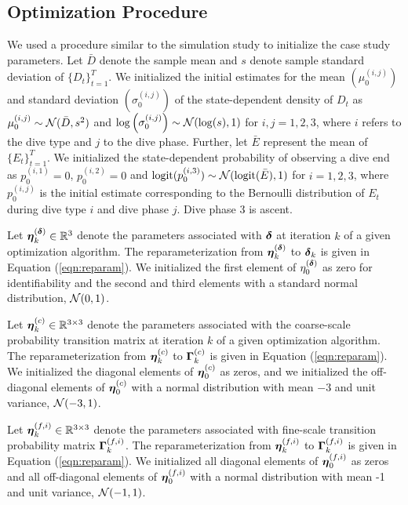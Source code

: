 \subsection{Optimization Procedure}

We used a procedure similar to the simulation study to initialize the case study parameters. Let $\bar D$ denote the sample mean and $s$ denote sample standard deviation of $\{D_t\}_{t=1}^T$. We initialized the initial estimates for the mean $\left(\mu^{(i,j)}_0\right)$ and standard deviation $\left(\sigma^{(i,j)}_0\right)$ of the state-dependent density of $D_t$ as
%
    $\mu^{(i,j)}_0 \sim \mathcal{N}(\bar D, s^2)$ and $\log\left(\sigma^{(i,j)}_0\right) \sim \mathcal{N}(\log(s),1)$ for $i,j = 1,2,3$,
%
where $i$ refers to the dive type and $j$ to the dive phase. Further, let $\bar E$ represent the mean of $\{E_t\}_{t=1}^T$. We initialized the state-dependent probability of observing a dive end as
%
    $p^{(i,1)}_0 = 0$, $p^{(i,2)}_0 = 0$ and $\operatorname*{logit}(p^{(i,3)}_0) \sim \mathcal{N}(\operatorname*{logit}(\bar E),1)$ for $i = 1,2,3$,
%
where $p^{(i,j)}_0$ is the initial estimate corresponding to the Bernoulli distribution of $E_t$ during dive type $i$ and dive phase $j$. Dive phase 3 is ascent.

Let $\boldsymbol{\eta}^{(\boldsymbol{\delta})}_k \in \mathbb{R}^3$ denote the parameters associated with $\boldsymbol{\delta}$ at iteration $k$ of a given optimization algorithm. The reparameterization from $\boldsymbol{\eta}^{(\boldsymbol{\delta})}_k$ to $\boldsymbol{\delta}_k$ is given in Equation (\ref{eqn:reparam}). We initialized the first element of $\eta^{(\boldsymbol{\delta})}_0$ as zero for identifiability and the second and third elements with a standard normal distribution, $\mathcal{N}(0,1)$.

Let $\boldsymbol{\eta}_k^{(c)} \in \mathbb{R}^{3 \times 3}$ denote the parameters associated with the coarse-scale probability transition matrix at iteration $k$ of a given optimization algorithm. The reparameterization from $\boldsymbol{\eta}_k^{(c)}$ to $\boldsymbol{\Gamma}_k^{(c)}$ is given in Equation (\ref{eqn:reparam}). We initialized the diagonal elements of $\boldsymbol{\eta}_0^{(c)}$ as zeros, and we initialized the off-diagonal elements of $\boldsymbol{\eta}_0^{(c)}$ with a normal distribution with mean $-3$ and unit variance, $\mathcal{N}(-3,1)$.

Let $\boldsymbol{\eta}_k^{(f,i)} \in \mathbb{R}^{3 \times 3}$ denote the parameters associated with fine-scale transition probability matrix $\boldsymbol{\Gamma}_k^{(f,i)}$. The reparameterization from $\boldsymbol{\eta}_k^{(f,i)}$ to $\boldsymbol{\Gamma}_k^{(f,i)}$ is given in Equation (\ref{eqn:reparam}). We initialized all diagonal elements of $\boldsymbol{\eta}_0^{(f,i)}$ as zeros and all off-diagonal elements of $\boldsymbol{\eta}_0^{(f,i)}$ with a normal distribution with mean -1 and unit variance, $\mathcal{N}(-1,1)$.


